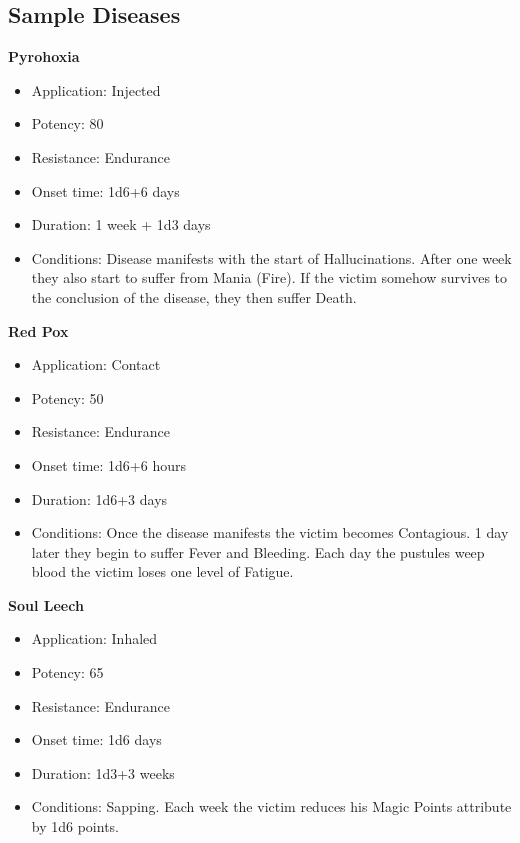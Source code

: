 \documentclass[10pt]{article}
\begin{document}
\subsection{Sample Diseases}
\label{sec:sample-diseases}
\textbf{Pyrohoxia}
\begin{itemize}[leftmargin=*]
    \item Application: Injected
    \item Potency: 80
    \item Resistance: Endurance
    \item Onset time: 1d6+6 days
    \item Duration: 1 week + 1d3 days
    \item Conditions: Disease manifests with the start of Hallucinations. After one week they also start to suffer from Mania (Fire). If the victim somehow survives to the conclusion of the disease, they then suffer Death.
\end{itemize}

\textbf{Red Pox}
\begin{itemize}[leftmargin=*]
    \item Application: Contact
    \item Potency: 50
    \item Resistance: Endurance
    \item Onset time: 1d6+6 hours
    \item Duration: 1d6+3 days
    \item Conditions: Once the disease manifests the victim becomes Contagious. 1 day later they begin to suffer Fever and Bleeding. Each day the pustules weep blood the victim loses one level of Fatigue.
\end{itemize}

\textbf{Soul Leech}
\begin{itemize}[leftmargin=*]
    \item Application: Inhaled
    \item Potency: 65
    \item Resistance: Endurance
    \item Onset time: 1d6 days
    \item Duration: 1d3+3 weeks
    \item Conditions: Sapping. Each week the victim reduces his Magic Points attribute by 1d6 points.
\end{itemize}
\end{document}
